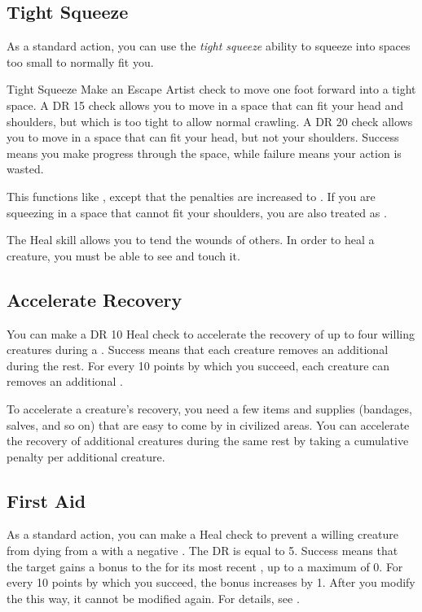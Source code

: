     \subsection{Tight Squeeze}
        As a standard action, you can use the \textit{tight squeeze} ability to squeeze into spaces too small to normally fit you.
        \begin{freeability}{Tight Squeeze}
            Make an Escape Artist check to move one foot forward into a tight space.
            A DR 15 check allows you to move in a space that can fit your head and shoulders, but which is too tight to allow normal crawling.
            A DR 20 check allows you to move in a space that can fit your head, but not your shoulders.
            Success means you make progress through the space, while failure means your action is wasted.

            This functions like , except that the penalties are increased to .
            If you are squeezing in a space that cannot fit your shoulders, you are also treated as .
        \end{freeability}

\newpage
{}
        The Heal skill allows you to tend the wounds of others. In order to heal a creature, you must be able to see and touch it.

    \subsection{Accelerate Recovery}\label{Accelerate Recovery}
        You can make a DR 10 Heal check to accelerate the recovery of up to four willing creatures during a .
        Success means that each creature removes an additional  during the rest.
        For every 10 points by which you succeed, each creature can removes an additional .

        To accelerate a creature's recovery, you need a few items and supplies (bandages, salves, and so on) that are easy to come by in civilized areas.
        You can accelerate the recovery of additional creatures during the same rest by taking a cumulative  penalty per additional creature.

    \subsection{First Aid}\label{First Aid}
        As a standard action, you can make a Heal check to prevent a willing creature from dying from a  with a negative .
        The DR is equal to 5.
        Success means that the target gains a  bonus to the  for its most recent , up to a maximum of 0.
        For every 10 points by which you succeed, the bonus increases by 1.
        After you modify the  this way, it cannot be modified again.
        For details, see .

